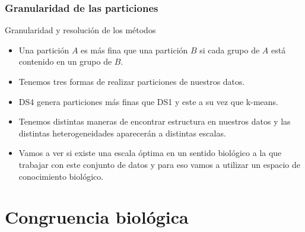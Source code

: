 \documentclass[serif,9pt, t]{beamer}
\begin{document}


\begin{frame}\frametitle{Granularidad de las particiones} 
Granularidad y resolución de los métodos
\bigskip
\begin{itemize}
\item Una partición $A$ es más fina que una partición $B$ si cada grupo de $A$ está contenido en un grupo de $B$.
\item Tenemos tres formas de realizar particiones de nuestros datos.
\item DS4 genera particiones más finas que DS1 y este a su vez que k-means.
\item Tenemos distintas maneras de encontrar estructura en nuestros datos y las distintas heterogeneidades aparecerán a distintas escalas.
\item Vamos a ver si existe una escala óptima en un sentido biológico a la que trabajar con este conjunto de datos y para eso vamos a utilizar un espacio de conocimiento biológico. 
\end{itemize}

\end{frame}

\section{Congruencia biológica}
\end{document}
